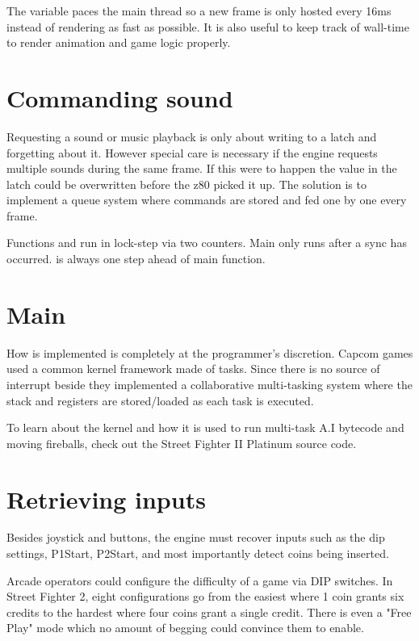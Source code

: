 \begin{trivia}
The  variable paces the main thread so a new frame is only hosted every 16ms instead of rendering as fast as possible. It is also useful to keep track of wall-time to render animation and game logic properly.
\end{trivia}


\section{Commanding sound}
Requesting a sound or music playback is only about writing to a latch and forgetting about it. However special care is necessary if the engine requests multiple sounds during the same frame. If this were to happen the value in the latch could be overwritten before the z80 picked it up.
The solution is to implement a queue system where commands are stored and fed one by one every frame. 

Functions  and  run in lock-step via two counters. Main only runs after a sync has occurred.  is always one step ahead of main function.

 

\section{Main}
 


How  is implemented is completely at the programmer's discretion. Capcom games used a common kernel framework made of tasks. Since there is no source of interrupt beside  they implemented a collaborative multi-tasking system where the stack and registers are stored/loaded as each task is executed.

To learn about the kernel and how it is used to run multi-task A.I bytecode and moving fireballs, check out the Street Fighter II Platinum source code\cite{sf2platinium}.

\section{Retrieving inputs}
Besides joystick and buttons, the engine must recover inputs such as the dip settings, P1Start, P2Start, and most importantly detect coins being inserted.

\begin{trivia}
Arcade operators could configure the difficulty of a game via DIP switches. In Street Fighter 2, eight configurations go from the easiest where 1 coin grants six credits to the hardest where four coins grant a single credit. There is even a "Free Play" mode which no amount of begging could convince them to enable\cite{sf2manual}.
\end{trivia}

